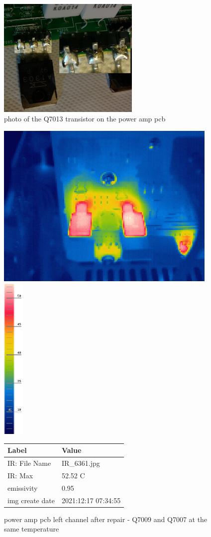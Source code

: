 \documentclass[a4paper,twoside,notitlepage]{article}
\begin{document}
\begin{figure}[hptb!]
\centering
 \includegraphics[width=6.8cm, keepaspectratio=true]{img_report/q7013}
 \caption{photo of the Q7013 transistor on the power amp pcb}
 \label{fig:q7013}
\end{figure}

\begin{figure}[hptb!]
 \centering
 \includegraphics[height=8cm, keepaspectratio=true]{img_report/IR_6361}
 \includegraphics[height=8cm, keepaspectratio=true]{img_report/IR_6361_scale}

 \vspace*{5mm}
 \begin{tabular}{ l | l }
  Label & Value \\ \hline
  IR: File Name & IR\_6361.jpg \\
  IR: Max & 52.52 C \\
  emissivity & 0.95 \\
  img create date & 2021:12:17 07:34:55
 \end{tabular}

 \caption{power amp pcb left channel after repair - Q7009 and Q7007 at the same temperature}
\end{figure}
\end{document}
